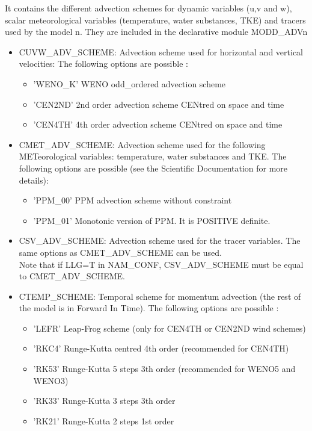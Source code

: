 It contains the different advection schemes for dynamic variables (u,v and w), scalar
meteorological variables
(temperature, water substances, TKE) and tracers used by the model n. 
They are included in the declarative module MODD\_ADVn
\begin{itemize}

\item
{}
CUVW\_ADV\_SCHEME: Advection scheme used for 
horizontal and vertical velocities:
The following options
are possible : 
\begin{itemize}
\item 'WENO\_K' WENO odd\_ordered advection scheme
\item 'CEN2ND' 2nd order advection scheme CENtred on space and time
\item 'CEN4TH' 4th order advection scheme CENtred on space and time
\end{itemize}

\item
{}
CMET\_ADV\_SCHEME: Advection scheme used for the following METeorological variables:
temperature, water substances and TKE. The following options
are possible (see the Scientific Documentation for more details): 
\begin{itemize}
\item 'PPM\_00' PPM advection scheme without constraint
\item 'PPM\_01' Monotonic version of PPM. It is POSITIVE definite.
\end{itemize}


\item
{}
CSV\_ADV\_SCHEME: Advection scheme used for the tracer variables. The same options as CMET\_ADV\_SCHEME can be used.\\

Note that if LLG=T in NAM\_CONF, CSV\_ADV\_SCHEME must be equal \\
to CMET\_ADV\_SCHEME.

\item
{}
CTEMP\_SCHEME: Temporal scheme for momentum advection (the rest of the model is in Forward In Time).
The following options are possible :
\begin{itemize}
\item 'LEFR' Leap-Frog scheme (only for CEN4TH or CEN2ND wind schemes)
\item 'RKC4' Runge-Kutta centred 4th order (recommended for CEN4TH)
\item 'RK53' Runge-Kutta 5 steps 3th order  (recommended for WENO5 and WENO3)
\item 'RK33' Runge-Kutta 3 steps 3th order 
\item 'RK21' Runge-Kutta 2 steps 1st order 
\end{itemize}



\end{itemize}
